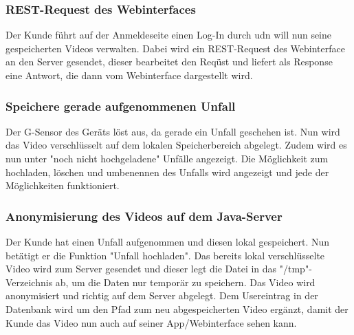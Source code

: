 \subsubsection{REST-Request des Webinterfaces}
Der Kunde f\"uhrt auf der Anmeldeseite einen Log-In durch udn will nun seine gespeicherten Videos verwalten. Dabei wird ein REST-Request des Webinterface an den Server gesendet, dieser bearbeitet den Req\"ust und liefert als Response eine Antwort, die dann vom Webinterface dargestellt wird.

\subsubsection{Speichere gerade aufgenommenen Unfall}
Der G-Sensor des Ger\"ats l\"ost aus, da gerade ein Unfall geschehen ist. Nun wird das Video verschl\"usselt auf dem lokalen Speicherbereich abgelegt. Zudem wird es nun unter "noch nicht hochgeladene" Unf\"alle angezeigt. Die M\"oglichkeit zum hochladen, l\"oschen und umbenennen des Unfalls wird angezeigt und jede der M\"oglichkeiten funktioniert.

\subsubsection{Anonymisierung des Videos auf dem Java-Server}
Der Kunde hat einen Unfall aufgenommen und diesen lokal gespeichert. Nun bet\"atigt er die Funktion "Unfall hochladen". Das bereits lokal verschl\"usselte Video wird zum Server gesendet und dieser legt die Datei in das "/tmp"-Verzeichnis ab, um die Daten nur tempor\"ar zu speichern. Das Video wird anonymisiert und richtig auf dem Server abgelegt. Dem Usereintrag in der Datenbank wird um den Pfad zum neu abgespeicherten Video erg\"anzt, damit der Kunde das Video nun auch auf seiner App/Webinterface sehen kann.
